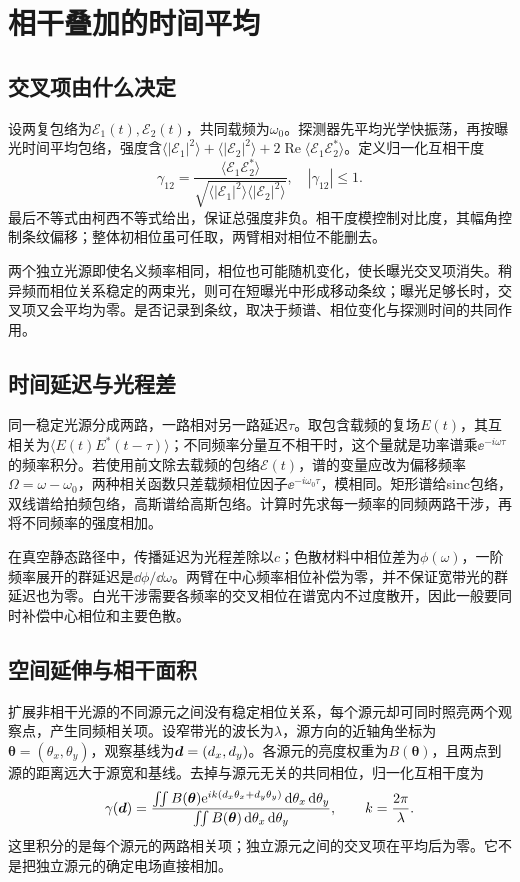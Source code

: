 \section{相干叠加的时间平均}
\subsection{交叉项由什么决定}
设两复包络为$\mathcal E_1(t),\mathcal E_2(t)$，共同载频为$\omega_0$。探测器先平均光学快振荡，再按曝光时间平均包络，强度含$\langle|\mathcal E_1|^2\rangle+\langle|\mathcal E_2|^2\rangle+2\operatorname{Re}\langle\mathcal E_1\mathcal E_2^*\rangle$。定义归一化互相干度
\[
 \gamma_{12}=\frac{\langle\mathcal E_1\mathcal E_2^*\rangle}
 {\sqrt{\langle|\mathcal E_1|^2\rangle\langle|\mathcal E_2|^2\rangle}},
 \quad |\gamma_{12}|\leq1.
\]
最后不等式由柯西不等式给出，保证总强度非负。相干度模控制对比度，其幅角控制条纹偏移；整体初相位虽可任取，两臂相对相位不能删去。

两个独立光源即使名义频率相同，相位也可能随机变化，使长曝光交叉项消失。稍异频而相位关系稳定的两束光，则可在短曝光中形成移动条纹；曝光足够长时，交叉项又会平均为零。是否记录到条纹，取决于频谱、相位变化与探测时间的共同作用。

\subsection{时间延迟与光程差}
同一稳定光源分成两路，一路相对另一路延迟$\tau$。取包含载频的复场$E(t)$，其互相关为$\langle E(t)E^*(t-\tau)\rangle$；不同频率分量互不相干时，这个量就是功率谱乘$\ee^{-i\omega\tau}$的频率积分。若使用前文除去载频的包络$\mathcal E(t)$，谱的变量应改为偏移频率$\Omega=\omega-\omega_0$，两种相关函数只差载频相位因子$\ee^{-i\omega_0\tau}$，模相同。矩形谱给sinc包络，双线谱给拍频包络，高斯谱给高斯包络。计算时先求每一频率的同频两路干涉，再将不同频率的强度相加。

在真空静态路径中，传播延迟为光程差除以$c$；色散材料中相位差为$\phi(\omega)$，一阶频率展开的群延迟是$\dd\phi/\dd\omega$。两臂在中心频率相位补偿为零，并不保证宽带光的群延迟也为零。白光干涉需要各频率的交叉相位在谱宽内不过度散开，因此一般要同时补偿中心相位和主要色散。

\subsection{空间延伸与相干面积}
扩展非相干光源的不同源元之间没有稳定相位关系，每个源元却可同时照亮两个观察点，产生同频相关项。设窄带光的波长为$\lambda$，源方向的近轴角坐标为$\boldsymbol\theta=(\theta_x,\theta_y)$，观察基线为$\bm{d}=(d_x,d_y)$。各源元的亮度权重为$B(\boldsymbol\theta)$，且两点到源的距离远大于源宽和基线。去掉与源元无关的共同相位，归一化互相干度为
\[
 \gamma(\bm{d})=
 \frac{\iint B(\boldsymbol\theta)
 \mathrm e^{ik(d_x\theta_x+d_y\theta_y)}\mathop{}\!\mathrm d\theta_x\mathop{}\!\mathrm d\theta_y}
 {\iint B(\boldsymbol\theta)\mathop{}\!\mathrm d\theta_x\mathop{}\!\mathrm d\theta_y},
 \qquad k=\frac{2\pi}{\lambda}.
\]
这里积分的是每个源元的两路相关项；独立源元之间的交叉项在平均后为零。它不是把独立源元的确定电场直接相加。

